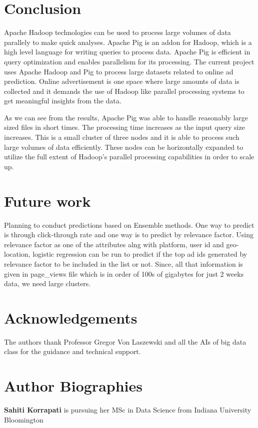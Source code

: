 \documentclass[9pt,twocolumn,twoside]{../../styles/osajnl}
\begin{document}
\section{Conclusion}
Apache Hadoop technologies can be used to process large volumes of data parallely to make quick analyses. Apache Pig is an addon for Hadoop, which is a high level language for writing queries to process data. Apache Pig is efficient in query optimization and enables parallelism for its processing. The current project uses Apache Hadoop and Pig to process large datasets related to online ad prediction. Online advertisement is one space where large amounts of data is collected and it demands the use of Hadoop like parallel processing systems to get meaningful insights from the data. 

As we can see from the results, Apache Pig was able to handle reasonably large sized files in short times. The processing time increases as the input query size increases. This is a small cluster of three nodes and it is able to process such large volumes of data efficiently. These nodes can be horizontally expanded to utilize the full extent of Hadoop's parallel processing capabilities in order to scale up. 

\section{Future work}
Planning to conduct predictions based on Ensemble methods. One way to predict is through click-through rate and one way is to predict by relevance factor. Using relevance factor as one of the attributes alng with platform, user id and geo-location, logistic regression can be run to predict if the top ad ids generated by relevance factor to be included in the list or not. Since, all that information is given in page\_views file which is in order of 100s of gigabytes for just 2 weeks data, we need large clusters. 

\section*{Acknowledgements}

The authors thank Professor Gregor Von Laszewski and all the AIs of big data class for the guidance and technical support.


 
\section*{Author Biographies}
\begingroup
\setlength\intextsep{0pt}
\begin{minipage}[t][3.2cm][t]{1.0\columnwidth} %
  \noindent
  {\bfseries Sahiti Korrapati} is pursuing her MSc in Data Science from
  Indiana University Bloomington
\end{minipage}
\endgroup
\end{document}
